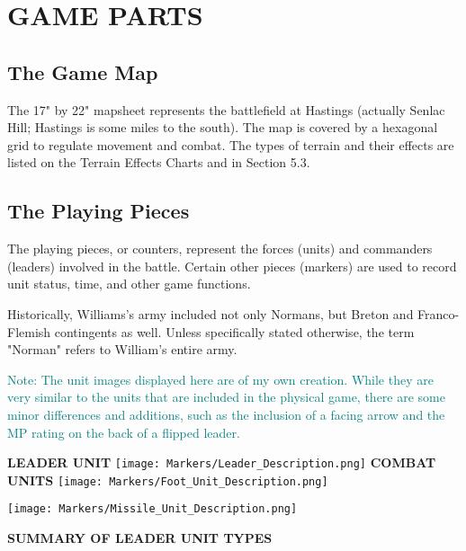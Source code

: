 \section{GAME PARTS}

\subsection{The Game Map}

The 17" by 22" mapsheet represents the battlefield at Hastings (actually Senlac Hill; Hastings is some miles to the south). The map is covered by a hexagonal grid to regulate movement and combat. The types of terrain and their effects are listed on the Terrain Effects Charts and in Section 5.3.

\subsection{The Playing Pieces}

The playing pieces, or counters, represent the forces (units) and commanders (leaders) involved in the battle. Certain other pieces (markers) are used to record unit status, time, and other game functions.

Historically, Williams's army included not only Normans, but Breton and Franco-Flemish contingents as well. Unless specifically stated otherwise, the term "Norman" refers to William's entire army.

\textcolor{teal}{Note: The unit images displayed here are of my own creation. While they are very similar to the units that are included in the physical game, there are some minor differences and additions, such as the inclusion of a facing arrow and the MP rating on the back of a flipped leader.}

\begin{center}
\textbf{LEADER UNIT}
\break
\texttt{[image: Markers/Leader\_Description.png]}
\break
\break
\textbf{COMBAT UNITS}
\break
\break
\texttt{[image: Markers/Foot\_Unit\_Description.png]}
\par
\texttt{[image: Markers/Missile\_Unit\_Description.png]}
\end{center}
\break

\renewcommand\tabularxcolumn[1]{m{#1}}

\par
\begin{center}
  \textbf{SUMMARY OF LEADER UNIT TYPES}
  \break
\end{center}

